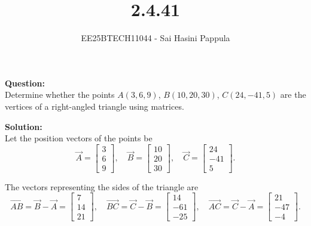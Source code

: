 \documentclass[journal]{IEEEtran}
\begin{document}

\vspace{3cm}

\title{2.4.41}
\author{EE25BTECH11044 - Sai Hasini Pappula}
 \maketitle
{\let\newpage\relax\maketitle}

\renewcommand{\thefigure}{\theenumi}
\renewcommand{\thetable}{\theenumi}
\setlength{\intextsep}{10pt} %


\renewcommand{\thetable}{\theenumi}

\textbf{Question:} \\
Determine whether the points 
$A(3,6,9)$, $B(10,20,30)$, $C(24,-41,5)$
are the vertices of a right-angled triangle using matrices.

\bigskip

\textbf{Solution:} \\

Let the position vectors of the points be
$$
\vec{A} = \begin{bmatrix}3\\6\\9\end{bmatrix}, \quad
\vec{B} = \begin{bmatrix}10\\20\\30\end{bmatrix}, \quad
\vec{C} = \begin{bmatrix}24\\-41\\5\end{bmatrix}.
$$

The vectors representing the sides of the triangle are
$$
\vec{AB} = \vec{B}-\vec{A} = \begin{bmatrix}7\\14\\21\end{bmatrix}, \quad
\vec{BC} = \vec{C}-\vec{B} = \begin{bmatrix}14\\-61\\-25\end{bmatrix}, \quad
\vec{AC} = \vec{C}-\vec{A} = \begin{bmatrix}21\\-47\\-4\end{bmatrix}.
$$
\end{document}
